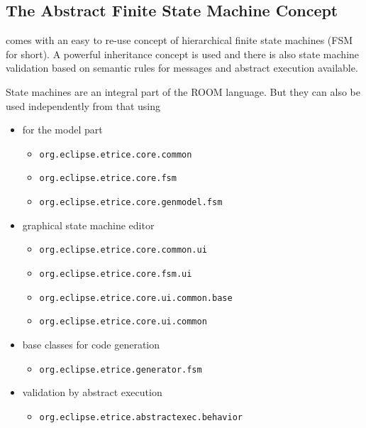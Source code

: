 \subsection{The Abstract Finite State Machine Concept}

\eTrice{} comes with an easy to re-use concept of hierarchical finite state machines (FSM for short).
A powerful inheritance concept is used and there is also state machine validation based on
semantic rules for messages and abstract execution available.

State machines are an integral part of the ROOM language. But they can also be used independently from that using

\begin{itemize}

\item for the model part
\begin{itemize}
\item \texttt{org.eclipse.etrice.core.common}
\item \texttt{org.eclipse.etrice.core.fsm}
\item \texttt{org.eclipse.etrice.core.genmodel.fsm}
\end{itemize}

\item graphical state machine editor
\begin{itemize}
\item \texttt{org.eclipse.etrice.core.common.ui}
\item \texttt{org.eclipse.etrice.core.fsm.ui}
\item \texttt{org.eclipse.etrice.core.ui.common.base}
\item \texttt{org.eclipse.etrice.core.ui.common}
\end{itemize}

\item base classes for code generation
\begin{itemize}
\item \texttt{org.eclipse.etrice.generator.fsm}
\end{itemize}

\item validation by abstract execution
\begin{itemize}
\item \texttt{org.eclipse.etrice.abstractexec.behavior}
\end{itemize}

\end{itemize}

